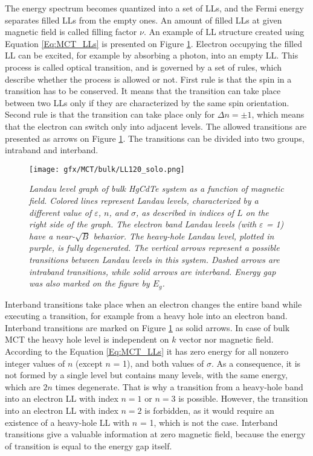 \documentclass[titlepage,a4paper]{book}
\begin{document}
The energy spectrum becomes quantized into a set of LLs, and the Fermi energy separates filled LLs from the empty ones. An amount of filled LLs at given magnetic field is called filling factor $\nu$. An example of LL structure created using Equation \ref{Eq:MCT_LLs} is presented on Figure \ref{fig:MCT_LL120_solo}. Electron occupying the filled LL can be excited, for example by absorbing a photon, into an empty LL. This process is called optical transition, and is governed by a set of rules, which describe whether the process is allowed or not. First rule is that the spin in a transition has to be conserved. It means that the transition can take place between two LLs only if they are characterized by the same spin orientation. Second rule is that the transition can take place only for $\Delta n = \pm 1$, which means that the electron can switch only into adjacent levels. The allowed transitions are presented as arrows on Figure \ref{fig:MCT_LL120_solo}. The transitions can be divided into two groups, intraband and interband. 
\begin{figure}[ht]
	\centering
	\texttt{[image: gfx/MCT/bulk/LL120\_solo.png]}
	\vspace{-10pt}
	\caption{\textit{Landau level graph of bulk HgCdTe system as a function of magnetic field. Colored lines represent Landau levels, characterized by a different value of $\varepsilon$, $n$, and $\sigma$, as described in indices of $L$ on the right side of the graph. The electron band Landau levels (with $\varepsilon$ = 1) have a near-$\sqrt{B}$ behavior. The heavy-hole Landau level, plotted in purple, is fully degenerated. The vertical arrows represent a possible transitions between Landau levels in this system. Dashed arrows are intraband transitions, while solid arrows are interband. Energy gap was also marked on the figure by $E_g$.}}
	\label{fig:MCT_LL120_solo}
\end{figure}

Interband transitions take place when an electron changes the entire band while executing a transition, for example from a heavy hole into an electron band. Interband transitions are marked on Figure \ref{fig:MCT_LL120_solo} as solid arrows. In case of bulk MCT the heavy hole level is independent on $k$ vector nor magnetic field. According to the Equation \ref{Eq:MCT_LLs} it has zero energy for all nonzero integer values of $n$ (except $n$ = 1), and both values of $\sigma$. As a consequence, it is not formed by a single level but contains many levels, with the same energy, which are $2n$ times degenerate. That is why a transition from a heavy-hole band into an electron LL with index $n = 1$ or $n = 3$  is possible. However, the transition into an electron LL with index $n = 2$ is forbidden, as it would require an existence of a heavy-hole LL with $n$ = 1, which is not the case. Interband transitions give a valuable information at zero magnetic field, because the energy of transition is equal to the energy gap itself. 
\end{document}
